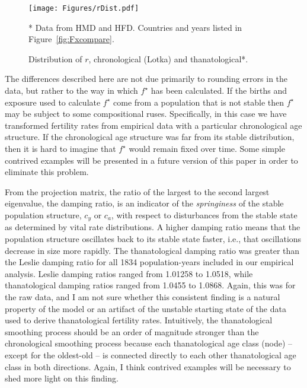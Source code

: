 \documentclass{article}
\begin{document}
\begin{figure}[h!]
	\caption{Distribution of $r$, chronological (Lotka) and thanatological*.}
	\begin{center}
		\label{fig:rDist}
		\texttt{[image: Figures/rDist.pdf]}
	\end{center}
	\begin{tiny}
     * Data from HMD and HFD. Countries and years listed in
     Figure~\ref{fig:Fxcompare}.
	\end{tiny}
\end{figure}

The differences described here are not due primarily to rounding errors in the
data, but rather to the way in which $f^\star$ has been calculated. If the
births and exposure used to calculate $f^\star$ come from a population that is not stable
then $f^\star$ may be subject to some compositional ruses. Specifically, in this
case we have transformed fertility rates from empirical data with a particular
chronological age structure. If the chronological age structure was far from its
stable distribution, then it is hard to imagine that $f^\star$ would remain
fixed over time. Some simple contrived examples will be presented in a future
version of this paper in order to eliminate this problem.

From the projection matrix, the ratio of the largest to the second largest
eigenvalue, the damping ratio, is an indicator of the \textit{springiness} of
the stable population structure, $c_y$ or $c_a$, with respect to disturbances from the stable state
as determined by vital rate distributions. A higher damping ratio means that the
population structure oscillates back to its stable state faster, i.e., that
oscillations decrease in size more rapidly. The thanatological damping ratio was
greater than the Leslie damping ratio for all 1834 population-years included in
our empirical analysis. Leslie damping ratios ranged from 1.01258 to 1.0518,
while thanatological damping ratios ranged from 1.0455 to 1.0868. Again, this
was for the raw data, and I am not sure whether this consistent finding is a
natural property of the model or an artifact of the unstable starting state of
the data used to derive thanatological fertility rates. Intuitively, the
thanatological smoothing process should be an order of magnitude stronger than
the chronological smoothing process because each thanatological age class
(node) -- except for the oldest-old -- is connected directly to each other
thanatological age class in both directions. Again, I think contrived examples
will be necessary to shed more light on this finding.
\end{document}
